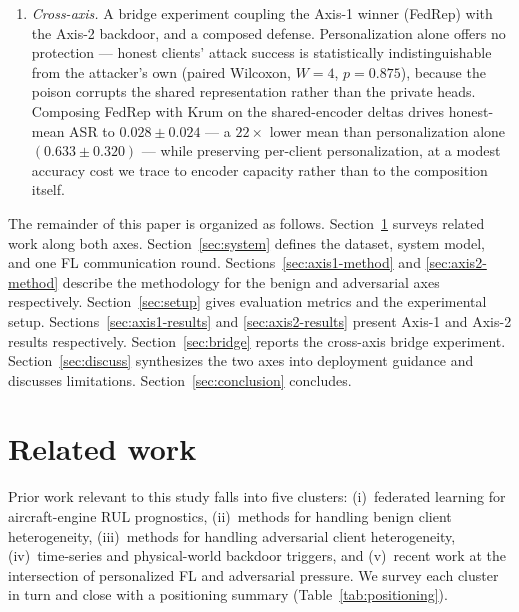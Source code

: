 \documentclass[a4paper,fleqn,doubleblind]{cas-sc}
\begin{document}
\begin{enumerate}
    \item \emph{Cross-axis.} A bridge experiment coupling the
    Axis-1 winner (FedRep) with the Axis-2 backdoor, and a composed
    defense. Personalization alone offers no protection --- honest
    clients' attack success is statistically indistinguishable from
    the attacker's own (paired Wilcoxon, $W = 4$, $p = 0.875$),
    because the poison corrupts the shared representation rather than
    the private heads. Composing FedRep with Krum on the
    shared-encoder deltas drives honest-mean ASR to
    $0.028 \pm 0.024$ --- a $22\times$ lower mean than
    personalization alone $(0.633 \pm 0.320)$ --- while preserving
    per-client personalization, at a modest accuracy cost we trace to
    encoder capacity rather than to the composition itself.
\end{enumerate}

The remainder of this paper is organized as follows.
Section~\ref{sec:related} surveys related work along both axes.
Section~\ref{sec:system} defines the dataset, system model, and one
FL communication round. Sections~\ref{sec:axis1-method} and
\ref{sec:axis2-method} describe the methodology for the benign and
adversarial axes respectively. Section~\ref{sec:setup} gives
evaluation metrics and the experimental setup.
Sections~\ref{sec:axis1-results} and \ref{sec:axis2-results} present
Axis-1 and Axis-2 results respectively. Section~\ref{sec:bridge}
reports the cross-axis bridge experiment. Section~\ref{sec:discuss}
synthesizes the two axes into deployment guidance and discusses
limitations. Section~\ref{sec:conclusion} concludes.


\section{Related work}
\label{sec:related}

Prior work relevant to this study falls into five clusters:
(i)~federated learning for aircraft-engine RUL prognostics,
(ii)~methods for handling benign client heterogeneity,
(iii)~methods for handling adversarial client heterogeneity,
(iv)~time-series and physical-world backdoor triggers, and
(v)~recent work at the intersection of personalized FL and
adversarial pressure. We survey each cluster in turn and close
with a positioning summary (Table~\ref{tab:positioning}).
\end{document}
